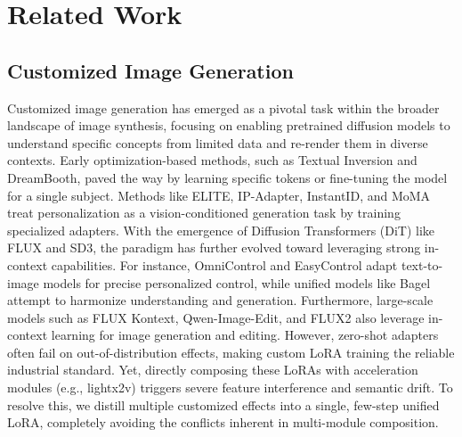 \section{Related Work}
\label{sec:related_work}

\subsection{Customized Image Generation}
Customized image generation has emerged as a pivotal task within the broader landscape of image synthesis, focusing on enabling pretrained diffusion models to understand specific concepts from limited data and re-render them in diverse contexts. Early optimization-based methods, such as Textual Inversion\cite{gal2022image} and DreamBooth\cite{ruiz2023dreambooth}, paved the way by learning specific tokens or fine-tuning the model for a single subject. 
Methods like ELITE\cite{wei2023elite}, IP-Adapter\cite{ye2023ip}, InstantID\cite{wang2024instantid}, and MoMA\cite{song2024moma} treat personalization as a vision-conditioned generation task by training specialized adapters. 
With the emergence of Diffusion Transformers (DiT)\cite{peebles2023scalable} like FLUX\cite{flux2024} and SD3\cite{esser2024scaling}, the paradigm has further evolved toward leveraging strong in-context capabilities. For instance, OmniControl\cite{xie2023omnicontrol} and EasyControl\cite{zhang2025easycontrol} adapt text-to-image models for precise personalized control, while unified models like Bagel\cite{deng2025emerging} attempt to harmonize understanding and generation. Furthermore, large-scale models such as FLUX Kontext\cite{labs2025flux}, Qwen-Image-Edit\cite{wu2025qwen}, and FLUX2\cite{flux-2-2025} also leverage in-context learning for image generation and editing. 
However, zero-shot adapters often fail on out-of-distribution effects, making custom LoRA training the reliable industrial standard. Yet, directly composing these LoRAs with acceleration modules (e.g., lightx2v\cite{lightx2v}) triggers severe feature interference and semantic drift. To resolve this, we distill multiple customized effects into a single, few-step unified LoRA, completely avoiding the conflicts inherent in multi-module composition.

